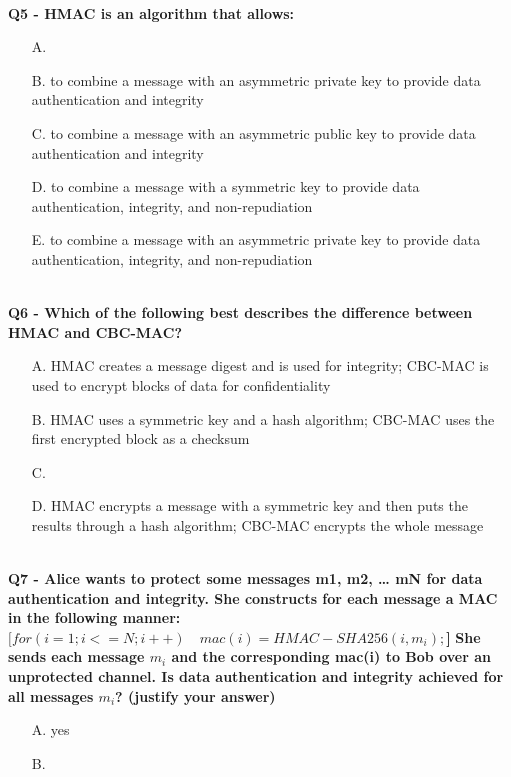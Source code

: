 \textbf{\\Q5 - HMAC is an algorithm that allows:}
\begin{enumerate}
    \item[A.] 
    \item[B.] to combine a message with an asymmetric private key to provide data authentication and integrity
    \item[C.] to combine a message with an asymmetric public key to provide data authentication and integrity
    \item[D.] to combine a message with a symmetric key to provide data authentication, integrity, and non-repudiation
    \item[E.] to combine a message with an asymmetric private key to provide data authentication, integrity, and non-repudiation
\end{enumerate}

\textbf{\\Q6 - Which of the following best describes the difference between HMAC and CBC-MAC?}
\begin{enumerate}
    \item[A.] HMAC creates a message digest and is used for integrity; CBC-MAC is used to encrypt blocks of data for confidentiality
    \item[B.] HMAC uses a symmetric key and a hash algorithm; CBC-MAC uses the first encrypted block as a checksum
    \item[C.] 
    \item[D.] HMAC encrypts a message with a symmetric key and then puts the results through a hash algorithm; CBC-MAC encrypts the whole message
\end{enumerate}

\textbf{\\Q7 - Alice wants to protect some messages m1, m2, … mN for data authentication and integrity. She constructs for each message a MAC in the following manner:}
\textbf{$[for (i=1; i<=N; i++) \quad mac(i) = HMAC-SHA256( i, m_{i} );$]}
\textbf{She sends each message $m_{i}$ and the corresponding mac(i)
to Bob over an unprotected channel.
Is data authentication and integrity achieved for all messages $m_{i}$? (justify your answer)}
\begin{enumerate}
    \item[A.] yes  
    \item[B.] 
\end{enumerate}

